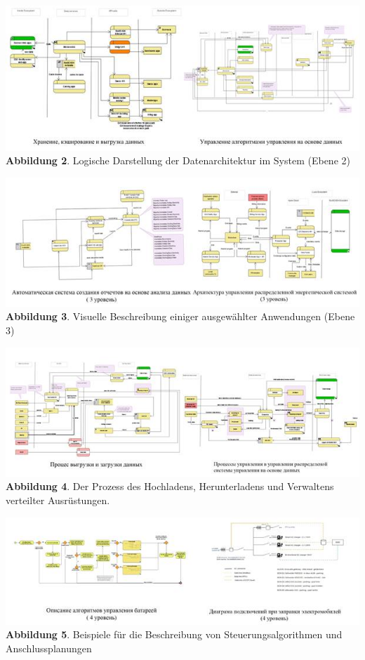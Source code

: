 \documentclass[11pt,a4paper]{article}
\begin{document}
\begin{center}
  \includegraphics[width=.95\textwidth]{image006.jpg}\\
  \textbf{Abbildung 2}. Logische Darstellung der Datenarchitektur im System
  (Ebene 2)
\end{center}
\begin{center}
  \includegraphics[width=.95\textwidth]{image008.jpg}\\
  \textbf{Abbildung 3}. Visuelle Beschreibung einiger ausgewählter
  Anwendungen (Ebene 3)
\end{center}
\begin{center}
  \includegraphics[width=.95\textwidth]{image010.jpg}\\
  \textbf{Abbildung 4}. Der Prozess des Hochladens, Herunterladens und
  Verwaltens verteilter Ausrüstungen.
\end{center}
\begin{center}
  \includegraphics[width=.95\textwidth]{image012.jpg}\\
  \textbf{Abbildung 5}. Beispiele für die Beschreibung von
  Steuerungsalgorithmen und Anschlussplanungen
\end{center}
\end{document}

